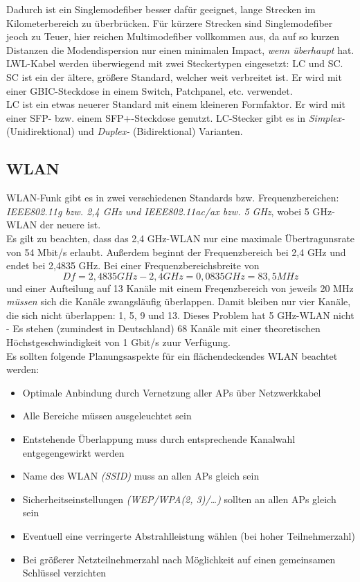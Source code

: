 \documentclass[a4paper, 12pt]{report}
\begin{document}
Dadurch ist ein Singlemodefiber besser dafür geeignet, lange Strecken im
Kilometerbereich zu überbrücken. Für kürzere Strecken sind Singlemodefiber jeoch
zu Teuer, hier reichen Multimodefiber vollkommen aus, da auf so kurzen Distanzen
die Modendispersion nur einen minimalen Impact, \emph{wenn überhaupt} hat. \\

LWL-Kabel werden überwiegend mit zwei Steckertypen eingesetzt: LC und SC. \\

SC ist ein der ältere, größere Standard, welcher weit verbreitet ist. Er wird
mit einer GBIC-Steckdose in einem Switch, Patchpanel, etc. verwendet. \\

LC ist ein etwas neuerer Standard mit einem kleineren Formfaktor. Er wird
mit einer SFP- bzw. einem SFP+-Steckdose genutzt. LC-Stecker gibt es in
\emph{Simplex-} (Unidirektional) und \emph{Duplex-} (Bidirektional) Varianten.

\subsection{WLAN}

WLAN-Funk gibt es in zwei verschiedenen Standards bzw. Frequenzbereichen:
\emph{IEEE802.11g bzw. 2,4 GHz und IEEE802.11ac/ax bzw. 5 GHz}, wobei 5 GHz-WLAN
der neuere ist. \\

Es gilt zu beachten, dass das 2,4 GHz-WLAN nur eine maximale Übertragunsrate von
54 Mbit/s erlaubt. Außerdem beginnt der Frequenzbereich bei 2,4 GHz und endet
bei 2,4835 GHz. Bei einer Frequenzbereichsbreite von $$Df = 2,4835 GHz - 2,4
GHz = 0,0835 GHz = 83,5 MHz$$ und einer Aufteilung auf 13 Kanäle mit einem
Freqenzbereich von jeweils 20 MHz \emph{müssen} sich die Kanäle zwangsläufig
überlappen. Damit bleiben nur vier Kanäle, die sich nicht überlappen: 1, 5, 9
und 13. Dieses Problem hat 5 GHz-WLAN nicht - Es stehen (zumindest in
Deutschland) 68 Kanäle mit einer theoretischen Höchstgeschwindigkeit von
1 Gbit/s zuur Verfügung. \\

Es sollten folgende Planungsaspekte für ein flächendeckendes WLAN beachtet
werden:

\begin{itemize}
    \item Optimale Anbindung durch Vernetzung aller APs über Netzwerkkabel
    \item Alle Bereiche müssen ausgeleuchtet sein
    \item Entstehende Überlappung muss durch entsprechende Kanalwahl
	entgegengewirkt werden
    \item Name des WLAN \emph{(SSID)} muss an allen APs gleich sein
    \item Sicherheitseinstellungen \emph{(WEP/WPA(2, 3)/\dots)} sollten an allen
	APs gleich sein
    \item Eventuell eine verringerte Abstrahlleistung wählen (bei hoher
	Teilnehmerzahl)
    \item Bei größerer Netzteilnehmerzahl nach Möglichkeit auf einen gemeinsamen
	Schlüssel verzichten
\end{itemize}
\end{document}
